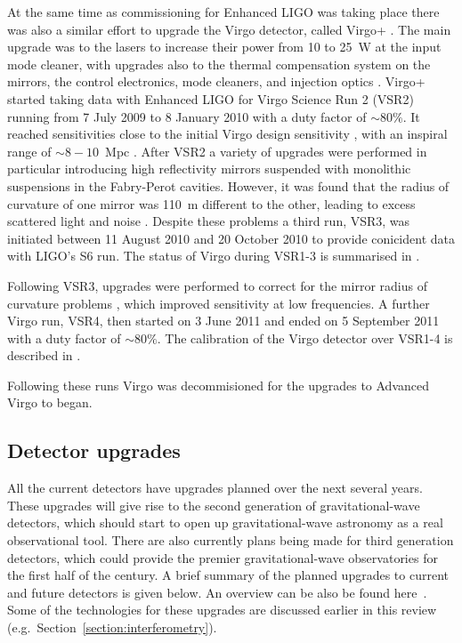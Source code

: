 At the same time as commissioning for Enhanced LIGO was taking place there was also a similar effort to 
upgrade the Virgo detector, called Virgo+ \cite{2011CQGra..28k4002A}. The main upgrade was to the lasers to 
increase their power from 10 to 25~W at the input mode cleaner, with upgrades also to the thermal compensation 
system on the mirrors, the control electronics, mode cleaners, and injection optics \cite{Acernese:2008b, 
AdvVirgoWhitepaper}. Virgo+ started taking data with Enhanced LIGO for Virgo Science Run 2 (VSR2) running from 
7 July 2009 to 8 January 2010 with a duty factor of $\sim 80\%$. It reached sensitivities close to the initial 
Virgo design sensitivity \cite{2012JInst...7.3012A}, with an inspiral range of $\sim 8-10$~Mpc 
\cite{VSR2paper}. After VSR2 a variety of upgrades were performed in particular introducing high reflectivity 
mirrors suspended with monolithic suspensions in the Fabry-Perot cavities. However, it was found that the 
radius of curvature of one mirror was 110~m different to the other, leading to excess scattered light and 
noise \cite{VSR2paper}. Despite these problems a third run, VSR3, was initiated between 11 August 2010 
and 20 October 2010 to provide conicident data with LIGO's S6 run. The status of Virgo during VSR1-3 is 
summarised in \cite{2012CQGra..29o5002A}.

Following VSR3, upgrades were performed to correct for the mirror radius of curvature problems 
\cite{VSR2paper}, which improved sensitivity at low frequencies. A further Virgo run, VSR4, then started on 3 
June 2011 and ended on 5 September 2011 with a duty factor of $\sim 80\%$. The calibration of the Virgo 
detector over VSR1-4 is described in \cite{2014CQGra..31p5013A}.

Following these runs Virgo was decommisioned for the upgrades to Advanced Virgo to began. 

\subsection{Detector upgrades}


All the current detectors have upgrades planned over the next several years.
These upgrades will give rise to the second generation of gravitational-wave
detectors, which should start to open up gravitational-wave astronomy as a
real observational tool. There are also currently plans being made for third
generation detectors, which could provide the premier gravitational-wave
observatories for the first half of the century. A brief summary of the planned
upgrades to current and future detectors is given below. An overview can be also
be found here~\cite{Whitcomb:2008}. Some of the technologies for these upgrades
are discussed earlier in this review (e.g.\, Section~\ref{section:interferometry}).


